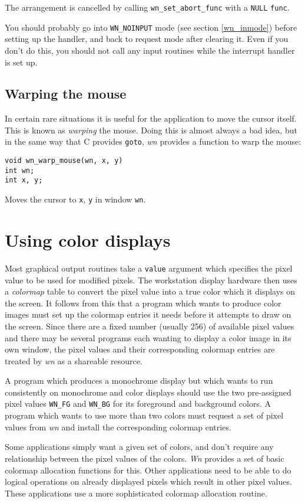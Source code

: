 The arrangement is cancelled by calling {\tt wn\_set\_abort\_func} with
a {\tt NULL} {\tt func}.

You should probably go into {\tt WN\_NOINPUT} mode (see section \ref{wn_inmode})
before setting up the handler, and back to request mode after clearing it.
Even if you don't do this, you should not call any input routines
while the interrupt handler is set up.
\subsection{Warping the mouse}
In certain rare situations it is useful for the application to move the
cursor itself.  This is known as {\em warping} the mouse.
Doing this is almost always a bad idea, but in the same way that C
provides {\tt goto}, {\em wn} provides a function to warp the mouse:
\begin{verbatim}
void wn_warp_mouse(wn, x, y)
int wn;
int x, y;
\end{verbatim}
Moves the cursor to {\tt x}, {\tt y} in window {\tt wn}.
\section{Using color displays}
Most graphical output routines take a {\tt value} argument which specifies
the pixel value to be used for modified pixels. The workstation display
hardware then uses a {\it colormap} table to convert the pixel value
into a true color which it displays on the screen. It follows from this that
a program which wants to produce color images must set up the colormap
entries it needs before it attempts to draw on the screen.
Since there are a fixed number (usually 256) of available pixel values
and there may be
several programs each wanting to display a color image in its own window, the
pixel values and their corresponding colormap entries are treated by
{\em wn} as a shareable resource.

A program which produces a monochrome display but which wants to run consistently
on monochrome and color displays should use the two pre-assigned pixel values
{\tt WN\_FG} and {\tt WN\_BG} for its foreground and background colors.  A program
which wants to use more than two colors must request a set of pixel values from {\em wn}
and install the corresponding colormap entries.

Some applications simply want a given set of colors, and don't require
any relationship between the pixel values of the colors.
{\em Wn} provides a set of basic colormap allocation functions for this.
Other applications need to be able to do logical operations on already
displayed pixels which result in other pixel values.
These applications use a more sophisticated colormap allocation
routine.
